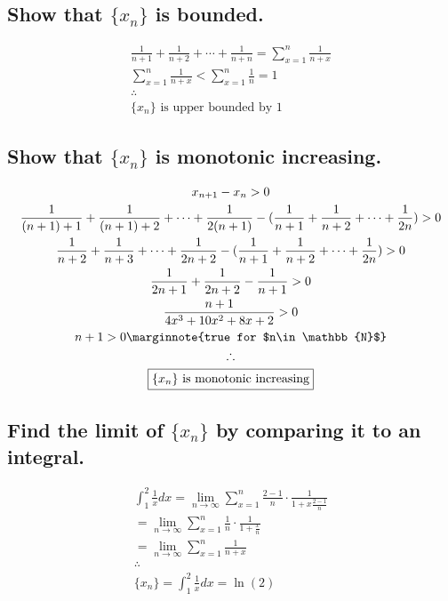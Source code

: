 \documentclass[letterpaper]{article}
\begin{document}
\subsection{Show that $\{x_n\}$ is bounded.}
\begin{gather*}
\frac{1}{n+1}+\frac{1}{n+2}+\dotsb+\frac{1}{n+n}=\sum_{x=1}^{n}\frac{1}{n+x} \\
\sum_{x=1}^{n}\frac{1}{n+x}<\sum_{x=1}^{n}\frac{1}{n}=1 \\
\therefore \\
\boxed{\{x_n\}\text{ is upper bounded by }1}
\end{gather*}
\subsection{Show that $\{x_n\}$ is monotonic increasing.}
\begin{gather*}
x_{n+1}-x_n>0 \\
\frac{1}{(n+1)+1}+\frac{1}{(n+1)+2}+\dotsb+\frac{1}{2(n+1)}-(\frac{1}{n+1}+\frac{1}{n+2}+\dotsb+\frac{1}{2n})>0 \\
\frac{1}{n+2}+\frac{1}{n+3}+\dotsb+\frac{1}{2n+2}-(\frac{1}{n+1}+\frac{1}{n+2}+\dotsb+\frac{1}{2n})>0 \\
\frac{1}{2n+1}+\frac{1}{2n+2}-\frac{1}{n+1}>0 \\
\frac{n+1}{4x^3+10x^2+8x+2}>0 \\
n+1>0 \marginnote{true for $n\in\mathbb{N}$} \\
\therefore \\
\boxed{\{x_n\} \text{ is monotonic increasing}}
\end{gather*}
\subsection{Find the limit of $\{x_n\}$ by comparing it to an integral.}
\begin{gather*}
\int_{1}^{2}\frac{1}{x}dx=\lim_{n\rightarrow\infty}\sum_{x=1}^{n}\frac{2-1}{n}\cdot\frac{1}{1+x\frac{2-1}{n}} \\
=\lim_{n\rightarrow\infty}\sum_{x=1}^{n}\frac{1}{n}\cdot\frac{1}{1+\frac{x}{n}} \\
=\lim_{n\rightarrow\infty}\sum_{x=1}^{n}\frac{1}{n+x} \\
\therefore \\
\boxed{\{x_n\}=\int_{1}^{2}\frac{1}{x}dx=\ln(2)}
\end{gather*}
\end{document}
